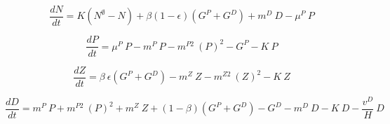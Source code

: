 \documentclass[template.tex]{subfiles}
\begin{document}
\begin{equation}
    \frac{d N}{d t} = 
    K (N^\emptyset - N) %
    + \beta(1 - \epsilon)(G^P + G^D) %
    + m^D \ D %
    - \mu^{P} \ P %
\end{equation}

\begin{equation}
    \frac{d P}{d t} =
    \mu^{P} \ P  %
    - m^P \ P %
    - m^{P2} \ (P)^2 %
    - G^P %
    - K \ P %
\end{equation}

\begin{equation}
    \frac{d Z}{d t} =
    \beta \ \epsilon(G^P + G^D) %
    - m^Z \ Z %
    - m^{Z2} \ (Z)^2 %
    - K \ Z %
\end{equation}

\begin{equation}
    \frac{d D}{d t} = 
    m^P \ P %
    + m^{P2} \ (P)^2 %
    + m^Z \ Z %
    + (1 - \beta)(G^P + G^D) %
    - G^D %
    - m^D \ D %
    - K \ D %
    - \frac{v^D}{H} \ D %
\end{equation}



\clearpage
\end{document}
